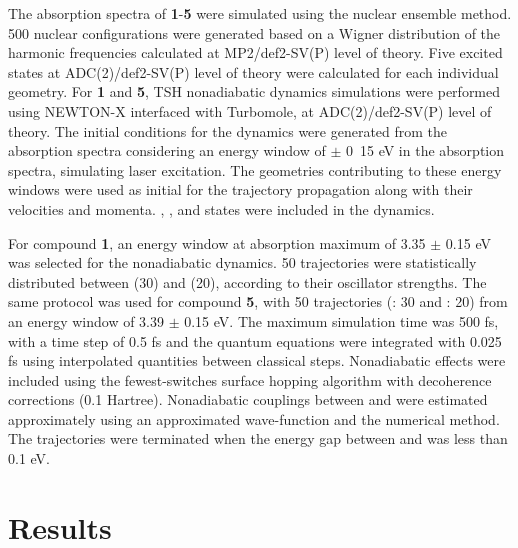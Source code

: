 The absorption spectra of \textbf{1}-\textbf{5} were simulated using the nuclear ensemble method. 500 nuclear configurations were generated based on a Wigner distribution of the harmonic frequencies calculated at MP2/def2-SV(P) level of theory.\cite{Crespo-Otero2012} Five excited states at ADC(2)/def2-SV(P) level of theory were calculated for each individual geometry. For \textbf{1} and \textbf{5}, \acf{TSH} nonadiabatic dynamics simulations were performed using NEWTON-X interfaced with Turbomole, at ADC(2)/def2-SV(P) level of theory.\cite{Barbatti2014} The initial conditions for the dynamics were generated from the absorption spectra considering an energy window of $\pm$ \si{0.15} {eV} in the absorption spectra, simulating laser excitation.\cite{Barbatti2007} The geometries contributing to these energy windows were used as initial for the trajectory propagation along with their velocities and momenta. \szero{}, \sone{}, and \stwo{} states were included in the dynamics. 

For compound \textbf{1}, an energy window at absorption maximum of 3.35 $\pm$ 0.15 eV was selected for the nonadiabatic dynamics. 50 trajectories were statistically distributed between \sone{} (30) and \stwo{} (20), according to their oscillator strengths. The same protocol was used for compound \textbf{5}, with 50 trajectories (\sone: 30 and \stwo: 20) from an energy window of 3.39 $\pm$ 0.15 eV. The maximum simulation time was 500 fs, with a time step of 0.5 fs and the quantum equations were integrated with 0.025 fs using interpolated quantities between classical steps. Nonadiabatic effects were included using the fewest-switches surface hopping algorithm with decoherence corrections (0.1 Hartree). Nonadiabatic couplings between \stwo{} and \sone{} were estimated approximately using an approximated wave-function and the numerical method.\cite{Ryabinkin2015} The trajectories were terminated when the energy gap between \sone{} and \szero{} was less than 0.1 eV.

\section{Results}\label{section: NRdecay_Results}

